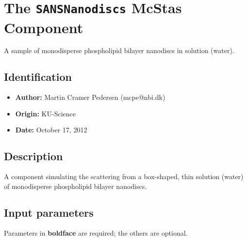 \section{The \texttt{SANSNanodiscs} McStas Component}
A sample of monodisperse phospholipid bilayer nanodiscs in solution (water).

\subsection*{Identification}
\begin{itemize}
  \item \textbf{Author:} Martin Cramer Pedersen (mcpe@nbi.dk)
  \item \textbf{Origin:} KU-Science
  \item \textbf{Date:} October 17, 2012
\end{itemize}

\subsection*{Description}
A component simulating the scattering from a box-shaped, thin solution (water) of monodisperse phospholipid bilayer nanodiscs.

\subsection*{Input parameters}
Parameters in \textbf{boldface} are required; the others are optional.

